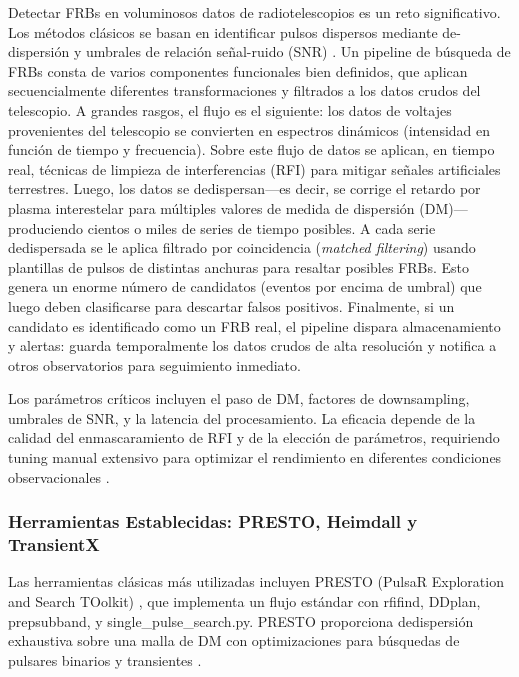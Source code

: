 Detectar FRBs en voluminosos datos de radiotelescopios es un reto significativo. Los métodos clásicos se basan en identificar pulsos dispersos mediante de-dispersión y umbrales de relación señal-ruido (SNR) \citep{CordesMcLaughlin2003}. Un pipeline de búsqueda de FRBs consta de varios componentes funcionales bien definidos, que aplican secuencialmente diferentes transformaciones y filtrados a los datos crudos del telescopio. A grandes rasgos, el flujo es el siguiente: los datos de voltajes provenientes del telescopio se convierten en espectros dinámicos (intensidad en función de tiempo y frecuencia). Sobre este flujo de datos se aplican, en tiempo real, técnicas de limpieza de interferencias (RFI) para mitigar señales artificiales terrestres. Luego, los datos se dedispersan—es decir, se corrige el retardo por plasma interestelar para múltiples valores de medida de dispersión (DM)—produciendo cientos o miles de series de tiempo posibles. A cada serie dedispersada se le aplica filtrado por coincidencia (\textit{matched filtering}) usando plantillas de pulsos de distintas anchuras para resaltar posibles FRBs. Esto genera un enorme número de candidatos (eventos por encima de umbral) que luego deben clasificarse para descartar falsos positivos. Finalmente, si un candidato es identificado como un FRB real, el pipeline dispara almacenamiento y alertas: guarda temporalmente los datos crudos de alta resolución y notifica a otros observatorios para seguimiento inmediato.

Los parámetros críticos incluyen el paso de DM, factores de downsampling, umbrales de SNR, y la latencia del procesamiento. La eficacia depende de la calidad del enmascaramiento de RFI y de la elección de parámetros, requiriendo tuning manual extensivo para optimizar el rendimiento en diferentes condiciones observacionales \citep{Ransom_2003}.

\subsubsection{Herramientas Establecidas: PRESTO, Heimdall y TransientX}

Las herramientas clásicas más utilizadas incluyen PRESTO (PulsaR Exploration and Search TOolkit) \citep{2011ascl.soft07017R}, que implementa un flujo estándar con rfifind, DDplan, prepsubband, y single\_pulse\_search.py. PRESTO proporciona dedispersión exhaustiva sobre una malla de DM con optimizaciones para búsquedas de pulsares binarios y transientes \citep{Ransom_2003}.

